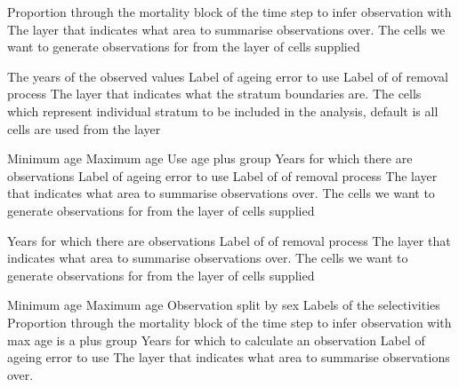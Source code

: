  {Proportion through the mortality block of the time step to infer observation with}
 {The layer that indicates what area to summarise observations over.}
 {The cells we want to generate observations for from the layer of cells supplied}
\par\textbf{}\par
{} {The years of the observed values}
 {Label of ageing error to use}
 {Label of of removal process}
 {The layer that indicates what the stratum boundaries are.}
 {The cells which represent individual stratum to be included in the analysis, default is all cells are used from the layer}
\par\textbf{}\par
{} {Minimum age}
 {Maximum age}
 {Use age plus group}
 {Years for which there are observations}
 {Label of ageing error to use}
 {Label of of removal process}
 {The layer that indicates what area to summarise observations over.}
 {The cells we want to generate observations for from the layer of cells supplied}
\par\textbf{}\par
{} {Years for which there are observations}
 {Label of of removal process}
 {The layer that indicates what area to summarise observations over.}
 {The cells we want to generate observations for from the layer of cells supplied}
\par\textbf{}\par
{} {Minimum age}
 {Maximum age}
 {Observation split by sex}
 {Labels of the selectivities}
 {Proportion through the mortality block of the time step to infer observation with}
 {max age is a plus group}
 {Years for which to calculate an observation}
 {Label of ageing error to use}
 {The layer that indicates what area to summarise observations over.}
